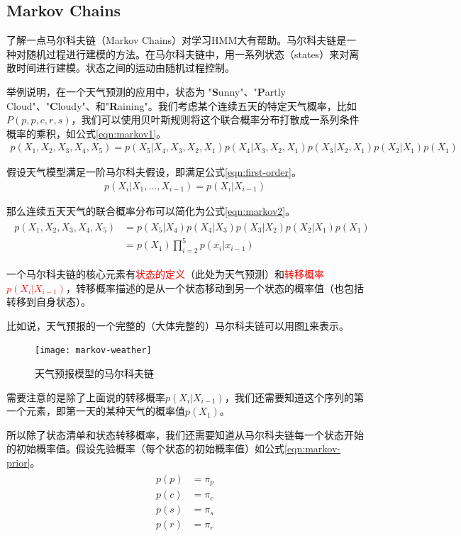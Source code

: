 \subsection{Markov Chains} 
了解一点马尔科夫链（Markov Chains）对学习HMM大有帮助。马尔科夫链是一种对随机过程进行建模的方法。在马尔科夫链中，用一系列状态（states）来对离散时间进行建模。状态之间的运动由随机过程控制。

举例说明，在一个天气预测的应用中，状态为 "{\bf S}unny"、"{\bf P}artly Cloud"、"{\bf C}loudy"、和"{\bf R}aining"。我们考虑某个连续五天的特定天气概率，比如$P(p,p,c,r,s)$，我们可以使用贝叶斯规则将这个联合概率分布打散成一系列条件概率的乘积，如公式\ref{eqn:markov1}。
\begin{align}
\label{eqn:markov1}
  p(X_1, X_2, X_3, X_4, X_5)=p(X_5 | X_4, X_3, X_2, X_1) p(X_4 | X_3, X_2, X_1) p(X_3 | X_2, X_1) p(X_2 | X_1) p(X_1)
\end{align}

假设天气模型满足一阶马尔科夫假设，即满足公式\ref{eqn:first-order}。
\begin{align}
\label{eqn:first-order}
  p(X_i |X_1, ..., X_{i-1})=p(X_i | X_{i-1})
\end{align}

那么连续五天天气的联合概率分布可以简化为公式\ref{eqn:markov2}。
\begin{align}
\label{eqn:markov2}
\begin{split}
  p(X_1, X_2, X_3, X_4, X_5)
      &= p(X_5 | X_4) p(X_4 | X_3) p(X_3 | X_2) p(X_2 | X_1) p(X_1) \\
      &= p(X_1)\prod_{i=2}^{5}p(x_i|x_{i-1})
\end{split}
\end{align}

一个马尔科夫链的核心元素有\textcolor{red}{状态的定义}（此处为天气预测）和\textcolor{red}{转移概率$p(X_i|X_{i-1})$}，转移概率描述的是从一个状态移动到另一个状态的概率值（也包括转移到自身状态）。

比如说，天气预报的一个完整的（大体完整的）马尔科夫链可以用图\ref{fig:markov-weather}来表示。
\begin{figure}[htbp]
  \centering
  \texttt{[image: markov-weather]}
  \caption{天气预报模型的马尔科夫链\label{fig:markov-weather}}
\end{figure}

需要注意的是除了上面说的转移概率$p(X_i|X_{i-1})$，我们还需要知道这个序列的第一个元素，即第一天的某种天气的概率值$p(X_1)$。

所以除了状态清单和状态转移概率，我们还需要知道从马尔科夫链每一个状态开始的初始概率值。假设先验概率（每个状态的初始概率值）如公式\ref{eqn:markov-prior}。
\begin{align}
\label{eqn:markov-prior}
\begin{split}
  p(p) &= \pi_{p} \\
  p(c) &= \pi_{c} \\
  p(s) &= \pi_{s} \\
  p(r) &= \pi_{r}
\end{split}
\end{align}

